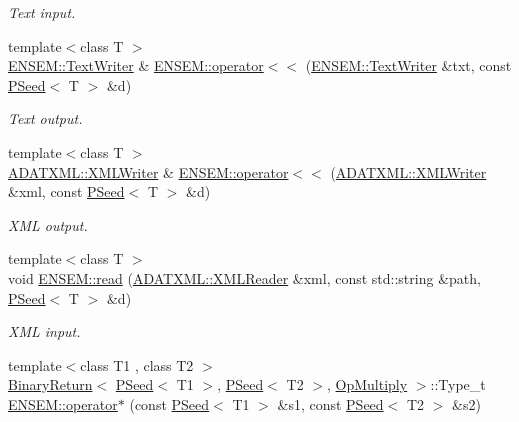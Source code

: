 \begin{DoxyCompactItemize}
\begin{DoxyCompactList}\small\item\em Text input. \end{DoxyCompactList}\item 
{\footnotesize template$<$class T $>$ }\\\mbox{\hyperlink{classENSEM_1_1TextWriter}{E\+N\+S\+E\+M\+::\+Text\+Writer}} \& \mbox{\hyperlink{group__primseed_ga297984102d54c010e9c54ca03f4f8151}{E\+N\+S\+E\+M\+::operator$<$$<$}} (\mbox{\hyperlink{classENSEM_1_1TextWriter}{E\+N\+S\+E\+M\+::\+Text\+Writer}} \&txt, const \mbox{\hyperlink{classENSEM_1_1PSeed}{P\+Seed}}$<$ T $>$ \&d)
\begin{DoxyCompactList}\small\item\em Text output. \end{DoxyCompactList}\item 
{\footnotesize template$<$class T $>$ }\\\mbox{\hyperlink{classADATXML_1_1XMLWriter}{A\+D\+A\+T\+X\+M\+L\+::\+X\+M\+L\+Writer}} \& \mbox{\hyperlink{group__primseed_ga439f61b77175a57d5c91c25e0eda2733}{E\+N\+S\+E\+M\+::operator$<$$<$}} (\mbox{\hyperlink{classADATXML_1_1XMLWriter}{A\+D\+A\+T\+X\+M\+L\+::\+X\+M\+L\+Writer}} \&xml, const \mbox{\hyperlink{classENSEM_1_1PSeed}{P\+Seed}}$<$ T $>$ \&d)
\begin{DoxyCompactList}\small\item\em X\+ML output. \end{DoxyCompactList}\item 
{\footnotesize template$<$class T $>$ }\\void \mbox{\hyperlink{group__primseed_ga419a0f6fba320ad373bae7c40e3d2330}{E\+N\+S\+E\+M\+::read}} (\mbox{\hyperlink{classADATXML_1_1XMLReader}{A\+D\+A\+T\+X\+M\+L\+::\+X\+M\+L\+Reader}} \&xml, const std\+::string \&path, \mbox{\hyperlink{classENSEM_1_1PSeed}{P\+Seed}}$<$ T $>$ \&d)
\begin{DoxyCompactList}\small\item\em X\+ML input. \end{DoxyCompactList}\item 
{\footnotesize template$<$class T1 , class T2 $>$ }\\\mbox{\hyperlink{structENSEM_1_1BinaryReturn}{Binary\+Return}}$<$ \mbox{\hyperlink{classENSEM_1_1PSeed}{P\+Seed}}$<$ T1 $>$, \mbox{\hyperlink{classENSEM_1_1PSeed}{P\+Seed}}$<$ T2 $>$, \mbox{\hyperlink{structENSEM_1_1OpMultiply}{Op\+Multiply}} $>$\+::Type\+\_\+t \mbox{\hyperlink{group__primseed_ga519cf992fa84c24500a0128f1c684b8f}{E\+N\+S\+E\+M\+::operator$\ast$}} (const \mbox{\hyperlink{classENSEM_1_1PSeed}{P\+Seed}}$<$ T1 $>$ \&s1, const \mbox{\hyperlink{classENSEM_1_1PSeed}{P\+Seed}}$<$ T2 $>$ \&s2)

\end{DoxyCompactItemize}
